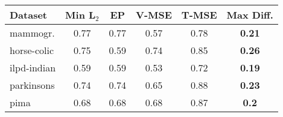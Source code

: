 \begin{table}[t]
	\centering
	\label{table:tuning-small}
	\begin{tabular}{lccccc} \toprule
		\textbf{Dataset} & \textbf{Min L$_2$} & \textbf{EP} & \textbf{V-MSE} & \textbf{T-MSE} & \textbf{Max Diff.} \\
		\midrule
		mammogr.         & 0.77               & 0.77        & 0.57           & 0.78           & \textbf{0.21}      \\
		horse-colic      & 0.75               & 0.59        & 0.74           & 0.85           & \textbf{0.26}      \\
		ilpd-indian      & 0.59               & 0.59        & 0.53           & 0.72           & \textbf{0.19}      \\
		parkinsons       & 0.74               & 0.74        & 0.65           & 0.88           & \textbf{0.23}      \\
		pima             & 0.68               & 0.68        & 0.68           & 0.87           & \textbf{0.2}       \\
		\bottomrule
	\end{tabular}
\end{table}
